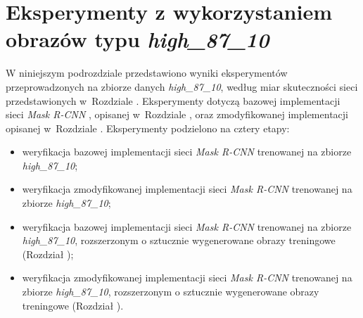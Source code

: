 \section{Eksperymenty z wykorzystaniem obrazów typu \textit{high\_87\_10}}
\label{sec:experymenty_high}
W niniejszym podrozdziale przedstawiono wyniki eksperymentów przeprowadzonych na zbiorze danych \textit{high\_87\_10}, według miar skuteczności sieci przedstawionych w~Rozdziale .
Eksperymenty dotyczą bazowej implementacji sieci \textit{Mask R-CNN} \cite{matterport-mask-rcnn}, opisanej w~Rozdziale , oraz zmodyfikowanej implementacji opisanej w~Rozdziale .
Eksperymenty podzielono na cztery etapy:

\begin{itemize}
 \item weryfikacja bazowej implementacji sieci \textit{Mask R-CNN} trenowanej na zbiorze \textit{high\_87\_10};
 \item weryfikacja zmodyfikowanej implementacji sieci \textit{Mask R-CNN} trenowanej na zbiorze \textit{high\_87\_10};
 \item weryfikacja bazowej implementacji sieci \textit{Mask R-CNN} trenowanej na zbiorze \textit{high\_87\_10}, rozszerzonym o sztucznie wygenerowane obrazy treningowe (Rozdział );
 \item weryfikacja zmodyfikowanej implementacji sieci \textit{Mask R-CNN} trenowanej na zbiorze \textit{high\_87\_10}, rozszerzonym o sztucznie wygenerowane obrazy treningowe (Rozdział ).
\end{itemize}
